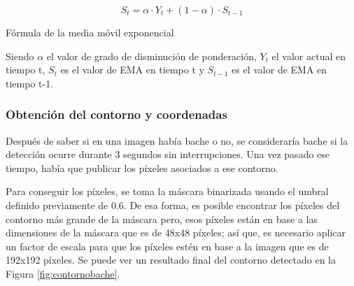 \begin{myequation}[h]
	\begin{equation}
		S_t = \alpha \cdot Y_t + (1 - \alpha) \cdot S_{t-1}
		\nonumber
	\end{equation}
	\caption[Fórmula de la media móvil exponencial]{Fórmula de la media móvil exponencial}
	\label{ec:ema2}
\end{myequation} 


Siendo $\alpha$  el valor de grado de disminución de ponderación, $Y_t$ el valor actual en tiempo t, $S_t$ es el valor de \acs{EMA} en tiempo t y $S_{t-1}$ es el valor de \acs{EMA} en tiempo t-1.
 
\subsubsection{Obtención del contorno y coordenadas}
\label{subsec:contornoycoordenadas}

Después de saber si en una imagen había bache o no, se consideraría bache si la detección ocurre durante 3 segundos sin interrupciones. Una vez pasado ese tiempo, había que publicar los píxeles asociados a ese contorno. 

Para conseguir los píxeles, se toma la máscara binarizada usando el umbral definido previamente de 0.6. De esa forma, es posible encontrar los píxeles del contorno más grande de la máscara pero, esos píxeles están en base a las dimensiones de la máscara que es de 48x48 píxeles; así que, es necesario aplicar un factor de escala para que los píxeles estén en base a la imagen que es de 192x192 píxeles. Se puede ver un resultado final del contorno detectado en la Figura \ref{fig:contornobache}.
  

